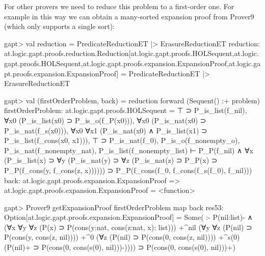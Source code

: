 \documentclass[a4paper,11pt]{article}
\begin{document}
For other provers we need to reduce this problem to a first-order one.  For
example in this way we can obtain a many-sorted expansion proof from Prover9
(which only supports a single sort):
\begin{clilisting}
gapt> val reduction = PredicateReductionET |> ErasureReductionET
reduction: at.logic.gapt.proofs.reduction.Reduction[at.logic.gapt.proofs.HOLSequent,at.logic.gapt.proofs.HOLSequent,at.logic.gapt.proofs.expansion.ExpansionProof,at.logic.gapt.proofs.expansion.ExpansionProof] = PredicateReductionET |> ErasureReductionET

gapt> val (firstOrderProblem, back) = reduction forward (Sequent() :+ problem)
firstOrderProblem: at.logic.gapt.proofs.HOLSequent =
⊤ ⊃ P_is_list(f_nil),
∀x0 (P_is_list(x0) ⊃ P_is_o(f_P(x0))),
∀x0 (P_is_nat(x0) ⊃ P_is_nat(f_s(x0))),
∀x0 ∀x1 (P_is_nat(x0) ∧ P_is_list(x1) ⊃ P_is_list(f_cons(x0, x1))),
⊤ ⊃ P_is_nat(f_0),
P_is_o(f_nonempty_o),
P_is_nat(f_nonempty_nat),
P_is_list(f_nonempty_list)
⊢
P_P(f_nil) ∧
    ∀x (P_is_list(x) ⊃
        ∀y (P_is_nat(y) ⊃
            ∀z (P_is_nat(z) ⊃ P_P(x) ⊃ P_P(f_cons(y, f_cons(z, x)))))) ⊃
  P_P(f_cons(f_0, f_cons(f_s(f_0), f_nil)))
back: at.logic.gapt.proofs.expansion.ExpansionProof => at.logic.gapt.proofs.expansion.ExpansionProof = <function>

gapt> Prover9 getExpansionProof firstOrderProblem map back
res53: Option[at.logic.gapt.proofs.expansion.ExpansionProof] =
Some(
:-
P(nil:list)- ∧
    (∀x ∀y ∀z (P(x) ⊃ P(cons(y:nat, cons(z:nat, x): list)))
      +^{nil}
        (∀y ∀z (P(nil) ⊃ P(cons(y, cons(z, nil))))
          +^{0}
            (∀z (P(nil) ⊃ P(cons(0, cons(z, nil))))
            +^{s(0)} (P(nil)+ ⊃ P(cons(0, cons(s(0), nil)))-)))) ⊃
  P(cons(0, cons(s(0), nil)))+)

\end{clilisting}
\end{document}
